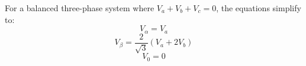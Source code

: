 \noindent
For a balanced three-phase system where \( V_a + V_b + V_c = 0 \), the equations simplify to:
\begin{equation*}
    V_\alpha = V_a
\end{equation*}
\begin{equation*}
    V_\beta = \frac{2}{\sqrt{3}} (V_a + 2 V_b)
\end{equation*}
\begin{equation*}
    V_0 = 0
\end{equation*}